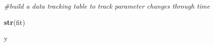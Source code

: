 \documentclass[]{book}
\newenvironment{Shaded}{\begin{snugshade}}{\end{snugshade}}
\newcommand{\KeywordTok}[1]{\textcolor[rgb]{0.13,0.29,0.53}{\textbf{{#1}}}}
\newcommand{\CommentTok}[1]{\textcolor[rgb]{0.56,0.35,0.01}{\textit{{#1}}}}
\newcommand{\NormalTok}[1]{{#1}}
\theoremstyle{definition}
\theoremstyle{definition}
\theoremstyle{remark}
\begin{document}
\begin{Shaded}
\begin{Highlighting}[]
\CommentTok{#build a data tracking table to track parameter changes through time}

\KeywordTok{str}\NormalTok{(fit)}

\NormalTok{y}
\end{Highlighting}
\end{Shaded}


\end{document}
